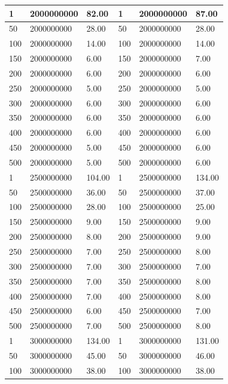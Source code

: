 \documentclass[letterpaper,10pt,titlepage]{article}
\begin{document}
\begin{enumerate}
\begin{tabular}{| l | l | l | l | l | l |}
\hline 1 & 2000000000 & 82.00 & 1 & 2000000000 & 87.00 \\
\hline 50 & 2000000000 & 28.00 & 50 & 2000000000 & 28.00 \\
\hline 100 & 2000000000 & 14.00 & 100 & 2000000000 & 14.00 \\
\hline 150 & 2000000000 & 6.00 & 150 & 2000000000 & 7.00 \\
\hline 200 & 2000000000 & 6.00 & 200 & 2000000000 & 6.00 \\
\hline 250 & 2000000000 & 5.00 & 250 & 2000000000 & 5.00 \\
\hline 300 & 2000000000 & 6.00 & 300 & 2000000000 & 6.00 \\
\hline 350 & 2000000000 & 6.00 & 350 & 2000000000 & 6.00 \\
\hline 400 & 2000000000 & 6.00 & 400 & 2000000000 & 6.00 \\
\hline 450 & 2000000000 & 5.00 & 450 & 2000000000 & 6.00 \\
\hline 500 & 2000000000 & 5.00 & 500 & 2000000000 & 6.00 \\
\hline 1 & 2500000000 & 104.00 & 1 & 2500000000 & 134.00 \\
\hline 50 & 2500000000 & 36.00 & 50 & 2500000000 & 37.00 \\
\hline 100 & 2500000000 & 28.00 & 100 & 2500000000 & 25.00 \\
\hline 150 & 2500000000 & 9.00 & 150 & 2500000000 & 9.00 \\
\hline 200 & 2500000000 & 8.00 & 200 & 2500000000 & 9.00 \\
\hline 250 & 2500000000 & 7.00 & 250 & 2500000000 & 8.00 \\
\hline 300 & 2500000000 & 7.00 & 300 & 2500000000 & 7.00 \\
\hline 350 & 2500000000 & 7.00 & 350 & 2500000000 & 8.00 \\
\hline 400 & 2500000000 & 7.00 & 400 & 2500000000 & 8.00 \\
\hline 450 & 2500000000 & 6.00 & 450 & 2500000000 & 7.00 \\
\hline 500 & 2500000000 & 7.00 & 500 & 2500000000 & 8.00 \\
\hline 1 & 3000000000 & 134.00 & 1 & 3000000000 & 131.00 \\
\hline 50 & 3000000000 & 45.00 & 50 & 3000000000 & 46.00 \\
\hline 100 & 3000000000 & 38.00 & 100 & 3000000000 & 38.00 \\
\hline
\end{tabular}
\newpage
\begin{tabular}{| l | l | l | l | l | l |}

\end{tabular}
\end{enumerate}
\end{document}
